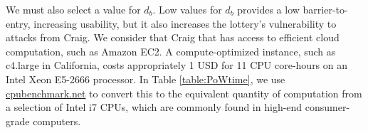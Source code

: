 \documentclass[USenglish,oneside,twocolumn]{article}
\newcommand*\nWinners{\left\vert{W_{i}}\right\vert}
\begin{document}
%
%
%
%
%
%
%
%

We must also select a value for $ d_{b} $. Low values for $ d_{b} $ provides a low barrier-to-entry, increasing usability, but it also increases the lottery's vulnerability to attacks from Craig. We consider that Craig that has access to efficient cloud computation, such as Amazon EC2. A compute-optimized instance, such as c4.large in California, costs appropriately 1 USD for 11 CPU core-hours on an Intel Xeon E5-2666 processor. In Table \ref{table:PoWtime}, we use \href{https://www.cpubenchmark.net/}{cpubenchmark.net} to convert this to the equivalent quantity of computation from a selection of Intel i7 CPUs, which are commonly found in high-end consumer-grade computers.
\end{document}

